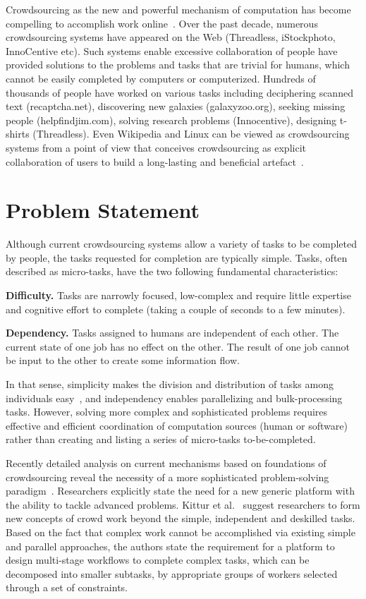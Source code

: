 Crowdsourcing as the new and powerful mechanism of computation has become 
compelling to accomplish work online~\cite{Kittur2011}. Over the past decade, numerous 
crowdsourcing systems have appeared on the Web (Threadless, iStockphoto, 
InnoCentive etc). Such systems enable excessive collaboration of people have 
provided solutions to the problems and tasks that are trivial for humans, which 
cannot be easily completed by computers or computerized. Hundreds of thousands 
of people have worked on various tasks including deciphering scanned text (recaptcha.net), 
discovering new galaxies (galaxyzoo.org), seeking missing people (helpfindjim.com), 
solving research problems (Innocentive), designing t-shirts (Threadless). Even 
Wikipedia and Linux can be viewed as crowdsourcing systems from a point of view that
conceives crowdsourcing as explicit collaboration of users to 
build a long-lasting and beneficial artefact~\cite{Doan2011}.


\section{Problem Statement}
\label{sec:problem}

Although current crowdsourcing systems allow a variety of tasks 
to be completed by people, the tasks requested for completion are typically simple. 
Tasks, often described as micro-tasks, have the two following fundamental characteristics:

\textbf{Difficulty.} Tasks are narrowly focused, low-complex and require 
little expertise and cognitive effort to complete (taking a couple of seconds to 
a few minutes).

\textbf{Dependency.} Tasks assigned to humans are independent of each other. 
The current state of one job has no effect on the other. The result of one job cannot 
be input to the other to create some information flow.

In that sense, simplicity makes the division and distribution of tasks among 
individuals easy~\cite{Zhang2011}, and independency enables parallelizing 
and bulk-processing tasks. However, solving more complex and sophisticated 
problems requires effective and efficient coordination of computation sources 
(human or software) rather than creating and listing a series of micro-tasks 
to-be-completed.

Recently detailed analysis on current mechanisms based on foundations of 
crowdsourcing reveal the necessity of a more sophisticated problem-solving 
paradigm~\cite{Kittur2013}. Researchers explicitly state the need for a new generic platform 
with the ability to tackle advanced problems. Kittur et al.~\cite{Kittur2013} 
suggest researchers to form new concepts of crowd work beyond 
the simple, independent and deskilled tasks. Based on the fact that complex 
work cannot be accomplished via existing simple and parallel approaches,
the authors state the requirement for a platform to design multi-stage workflows 
to complete complex tasks, which can be decomposed into smaller subtasks, 
by appropriate groups of workers selected through a set of constraints.

